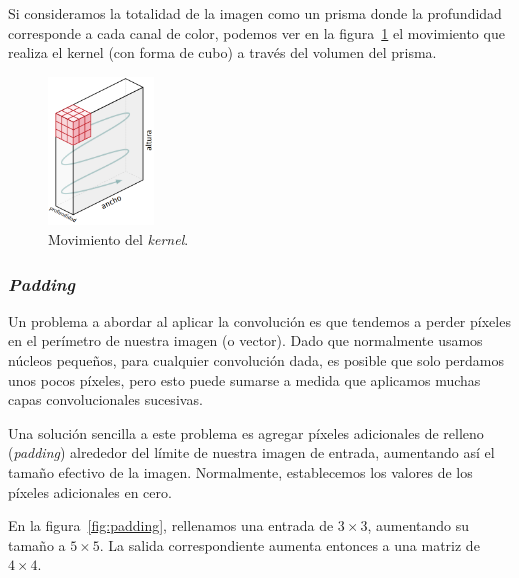 \documentclass[a4paper,12pt]{article}
\begin{document}
Si consideramos la totalidad de la imagen como un prisma donde la profundidad corresponde a cada canal de color, podemos ver en la figura~\ref{fig:kernelmove} el movimiento que realiza el kernel (con forma de cubo) a través del volumen del prisma.

\begin{figure}[H]
	\begin{center}				
		\includegraphics[width=0.25\textwidth]{kernelmove.png}
		\caption{Movimiento del \textit{kernel}.}
		\label{fig:kernelmove}
	\end{center}
\end{figure}

\subsubsection{\textit{Padding}}

Un problema a abordar al aplicar la convolución es que tendemos a perder píxeles en el perímetro de nuestra imagen (o vector). Dado que normalmente usamos núcleos pequeños, para cualquier convolución dada, es posible que solo perdamos unos pocos píxeles, pero esto puede sumarse a medida que aplicamos muchas capas convolucionales sucesivas. 

\clearpage
Una solución sencilla a este problema es agregar píxeles adicionales de relleno (\textit{padding}) alrededor del límite de nuestra imagen de entrada, aumentando así el tamaño efectivo de la imagen. Normalmente, establecemos los valores de los píxeles adicionales en cero. \citep{padding}

En la figura~\ref{fig:padding}, rellenamos una entrada de $3 \times 3$, aumentando su tamaño a $5 \times 5$. La salida correspondiente aumenta entonces a una matriz de $4 \times 4$.
\end{document}
